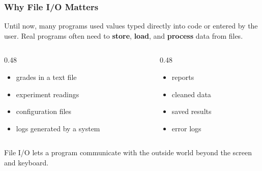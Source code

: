 \documentclass[aspectratio=169,10pt]{beamer}
\newcommand{\keyword}[1]{\textcolor{PrimaryBlue}{\textbf{#1}}}
\begin{document}
\begin{frame}[fragile]
\frametitle{Why File I/O Matters}
\small
Until now, many programs used values typed directly into code or entered by the user. Real programs often need to \keyword{store}, \keyword{load}, and \keyword{process} data from files.

\vspace{0.25cm}
\begin{columns}[T,totalwidth=0.96\textwidth]
\begin{column}{0.48\textwidth}
\begin{tcolorbox}[lecturebox,title=Examples of input files]
\begin{itemize}\setlength\itemsep{0.05cm}
  \item grades in a text file
  \item experiment readings
  \item configuration files
  \item logs generated by a system
\end{itemize}
\end{tcolorbox}
\end{column}
\begin{column}{0.48\textwidth}
\begin{tcolorbox}[lecturebox,title=Examples of output files]
\begin{itemize}\setlength\itemsep{0.05cm}
  \item reports
  \item cleaned data
  \item saved results
  \item error logs
\end{itemize}
\end{tcolorbox}
\end{column}
\end{columns}

\vspace{0.2cm}
\begin{tcolorbox}[lecturebox,title=Key idea]
File I/O lets a program communicate with the outside world beyond the screen and keyboard.
\end{tcolorbox}
\end{frame}
\end{document}
